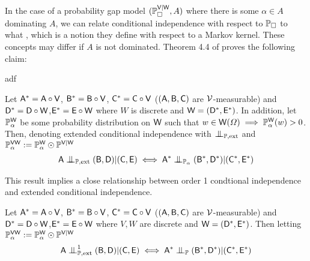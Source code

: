 
In the case of a probability gap model $(\mathbb{P}_{\square}^{\mathsf{V}|\mathsf{W}},A)$ where there is some $\alpha\in A$ dominating $A$, we can relate conditional independence with respect to $\mathbb{P}_\square$ to what , which is a notion they define with respect to a Markov kernel. These concepts may differ if $A$ is not dominated. Theorem 4.4 of \citet{constantinou_extended_2017} proves the following claim:

\begin{definition}
adf
\end{definition}

\begin{theorem}\label{th:dawid_constantionou}
Let $\mathsf{A}^*=\mathsf{A}\circ \mathsf{V}$, $\mathsf{B}^*=\mathsf{B}\circ\mathsf{V}$, $\mathsf{C}^*=\mathsf{C}\circ \mathsf{V}$ ($(\mathsf{A},\mathsf{B},\mathsf{C})$ are $\mathcal{V}$-measurable) and $\mathsf{D}^*=\mathsf{D}\circ \mathsf{W}$,$\mathsf{E}^*=\mathsf{E}\circ \mathsf{W}$ where $W$ is discrete and $\mathsf{W}=(\mathsf{D}^*,\mathsf{E}^*)$. In addition, let $\mathbb{P}_\alpha^{\mathsf{W}}$ be some probability distribution on $\mathsf{W}$ such that $w\in\mathsf{W}(\Omega)\implies \mathbb{P}_\alpha^{\mathsf{W}}(w)>0$. Then, denoting extended conditional independence with $\CI_{\prob{P},\text{ext}}$ and $\mathbb{P}_\alpha^{\mathsf{VW}}:=\mathbb{P}_\alpha^{\mathsf{W}}\odot \mathbb{P}^{\mathsf{V}|\mathsf{W}}$
\begin{align}
    \RV{A}\CI_{\prob{P},\text{ext}}(\RV{B},\RV{D})|(\RV{C},\RV{E})\iff \RV{A}^*\CI_{\prob{P}_\alpha}(\RV{B}^*,\RV{D}^*)|(\RV{C}^*,\RV{E}^*)
\end{align}
\end{theorem}

This result implies a close relationship between order 1 condtional independence and extended conditional independence.

\begin{theorem}
Let $\mathsf{A}^*=\mathsf{A}\circ \mathsf{V}$, $\mathsf{B}^*=\mathsf{B}\circ\mathsf{V}$, $\mathsf{C}^*=\mathsf{C}\circ \mathsf{V}$ ($(\mathsf{A},\mathsf{B},\mathsf{C})$ are $\mathcal{V}$-measurable) and $\mathsf{D}^*=\mathsf{D}\circ \mathsf{W}$,$\mathsf{E}^*=\mathsf{E}\circ \mathsf{W}$ where $V,W$ are discrete and $\mathsf{W}=(\mathsf{D}^*,\mathsf{E}^*)$. Then letting $\mathbb{P}_\alpha^{\mathsf{VW}}:=\mathbb{P}_\alpha^{\mathsf{W}}\odot \mathbb{P}^{\mathsf{V}|\mathsf{W}}$
\begin{align}
    \RV{A}\CI^1_{\prob{P},\text{ext}}(\RV{B},\RV{D})|(\RV{C},\RV{E})\iff \RV{A}^*\CI_{\prob{P}}(\RV{B}^*,\RV{D}^*)|(\RV{C}^*,\RV{E}^*)
\end{align}
\end{theorem}


